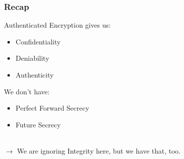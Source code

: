 \documentclass[
	aspectratio=169,
	xetex,
]{beamer}
\begin{document}
\begin{frame}
	\frametitle{Recap}
	Authenticated Encryption gives us:
	\begin{itemize}
		\item Confidentiality
		\item Deniability
		\item Authenticity
	\end{itemize}
	We don't have:
	\begin{itemize}
		\item Perfect Forward Secrecy
		\item Future Secrecy
	\end{itemize}
	\-\\[2em]
	\alert{$\rightarrow$} We are ignoring Integrity here, but we have that, too.
\end{frame}
\end{document}

